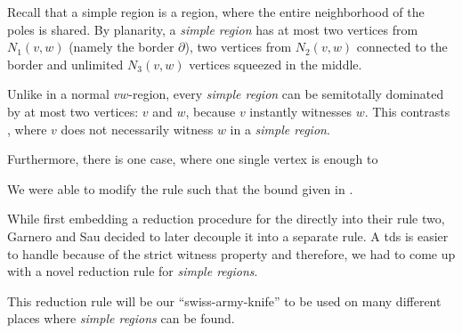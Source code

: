 Recall that a simple region is a region, where the entire neighborhood of the poles is shared.  
By planarity, a \textit{simple region} has at most two vertices from $N_1(v,w)$ (namely the border $\partial$), two vertices from $N_2(v,w)$ connected to the border and unlimited $N_3(v,w)$ vertices squeezed in the middle.

Unlike in a normal $vw$-region, every \textit{simple region} can be semitotally dominated by at most two vertices: $v$ and $w$, because $v$ instantly witnesses $w$. 
This contrasts \tdom, where $v$ does not necessarily witness $w$ in a \textit{simple region}.


Furthermore, there is one case, where one single vertex is enough to 

We were able to modify the rule such that the bound given in \cite{Garnero2018}.


%
%
%
%
While first embedding a reduction procedure for the \ptdom directly into their rule two, Garnero and Sau \cite{Garnero2018} decided to later decouple it into a separate rule.
A tds is easier to handle because of the strict witness property and therefore, we had to come up with a novel reduction rule for \textit{simple regions}.

This reduction rule will be our ``swiss-army-knife'' to be used on many different places where \textit{simple regions} can be found.

